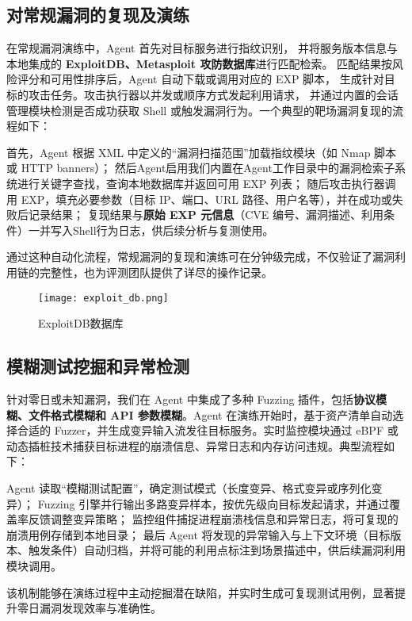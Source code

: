 \documentclass[lang=cn,10pt]{elegantbook}
\begin{document}
\subsection{对常规漏洞的复现及演练}

在常规漏洞演练中，Agent 首先对目标服务进行指纹识别，
并将服务版本信息与本地集成的 \textbf{ExploitDB、Metasploit 攻防数据库}进行匹配检索。
匹配结果按风险评分和可用性排序后，Agent 自动下载或调用对应的 EXP 脚本，
生成针对目标的攻击任务。攻击执行器以并发或顺序方式发起利用请求，
并通过内置的会话管理模块检测是否成功获取 Shell 或触发漏洞行为。一个典型的靶场漏洞复现的流程如下：

首先，Agent 根据 XML 中定义的“漏洞扫描范围”加载指纹模块（如 Nmap 脚本或 HTTP banners）；  
然后Agent启用我们内置在Agent工作目录中的漏洞检索子系统进行关键字查找，查询本地数据库并返回可用 EXP 列表；  
随后攻击执行器调用 EXP，填充必要参数（目标 IP、端口、URL 路径、用户名等），并在成功或失败后记录结果；  
复现结果与\textbf{原始 EXP 元信息}（CVE 编号、漏洞描述、利用条件）一并写入Shell行为日志，供后续分析与复测使用。

通过这种自动化流程，常规漏洞的复现和演练可在分钟级完成，不仅验证了漏洞利用链的完整性，也为评测团队提供了详尽的操作记录。

\begin{figure}[htbp]
\centering
\texttt{[image: exploit\_db.png]}  %
\caption{ExploitDB数据库}  %
\label{fig:ExploitDB}  %
\end{figure}

\subsection{模糊测试挖掘和异常检测}

针对零日或未知漏洞，我们在 Agent 中集成了多种 Fuzzing 插件，包括\textbf{协议模糊、文件格式模糊和 API 参数模糊}。Agent 在演练开始时，基于资产清单自动选择合适的 Fuzzer，并生成变异输入流发往目标服务。实时监控模块通过 eBPF 或动态插桩技术捕获目标进程的崩溃信息、异常日志和内存访问违规。典型流程如下：

Agent 读取“模糊测试配置”，确定测试模式（长度变异、格式变异或序列化变异）；  
Fuzzing 引擎并行输出多路变异样本，按优先级向目标发起请求，并通过覆盖率反馈调整变异策略；  
监控组件捕捉进程崩溃栈信息和异常日志，将可复现的崩溃用例存储到本地目录；  
最后 Agent 将发现的异常输入与上下文环境（目标版本、触发条件）自动归档，并将可能的利用点标注到场景描述中，供后续漏洞利用模块调用。

该机制能够在演练过程中主动挖掘潜在缺陷，并实时生成可复现测试用例，显著提升零日漏洞发现效率与准确性。
\end{document}
